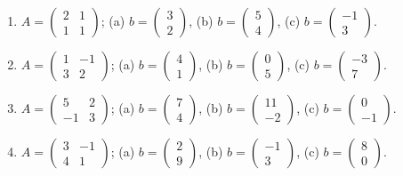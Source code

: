 \begin{enumerate}[label=\arabic*., leftmargin=*]

\item $A=\begin{pmatrix}2&1\\1&1\end{pmatrix}$; \quad
(a) $b=\begin{pmatrix}3\\2\end{pmatrix}$, \quad
(b) $b=\begin{pmatrix}5\\4\end{pmatrix}$, \quad
(c) $b=\begin{pmatrix}-1\\3\end{pmatrix}$.

\item $A=\begin{pmatrix}1&-1\\3&2\end{pmatrix}$; \quad
(a) $b=\begin{pmatrix}4\\1\end{pmatrix}$, \quad
(b) $b=\begin{pmatrix}0\\5\end{pmatrix}$, \quad
(c) $b=\begin{pmatrix}-3\\7\end{pmatrix}$.

\item $A=\begin{pmatrix}5&2\\-1&3\end{pmatrix}$; \quad
(a) $b=\begin{pmatrix}7\\4\end{pmatrix}$, \quad
(b) $b=\begin{pmatrix}11\\-2\end{pmatrix}$, \quad
(c) $b=\begin{pmatrix}0\\-1\end{pmatrix}$.

\item $A=\begin{pmatrix}3&-1\\4&1\end{pmatrix}$; \quad
(a) $b=\begin{pmatrix}2\\9\end{pmatrix}$, \quad
(b) $b=\begin{pmatrix}-1\\3\end{pmatrix}$, \quad
(c) $b=\begin{pmatrix}8\\0\end{pmatrix}$.


\end{enumerate}
